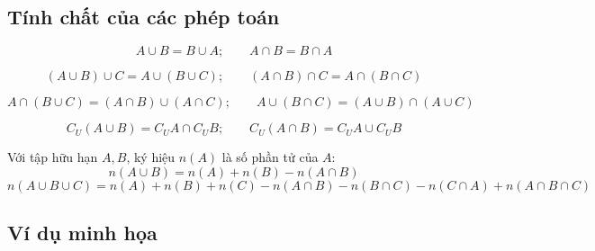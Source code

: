 \documentclass[12pt, a4paper]{report}
\begin{document}
\subsection{Tính chất của các phép toán}

\begin{dinhly}
  \[
    A \cup B = B \cup A; \qquad A \cap B = B \cap A
  \]
\end{dinhly}

\begin{dinhly}
  \[
    (A \cup B) \cup C = A \cup (B \cup C); \qquad (A \cap B) \cap C = A \cap (B \cap C)
  \]
\end{dinhly}

\begin{dinhly}
  \[
    A \cap (B \cup C) = (A \cap B) \cup (A \cap C); \qquad
    A \cup (B \cap C) = (A \cup B) \cap (A \cup C)
  \]
\end{dinhly}

\begin{dinhly}
  \[
    C_U(A \cup B) = C_U A \cap C_U B; \qquad
    C_U(A \cap B) = C_U A \cup C_U B
  \]
\end{dinhly}

\begin{dinhly}
  Với tập hữu hạn \(A, B\), ký hiệu \(n(A)\) là số phần tử của \(A\):
  \[
    n(A \cup B) = n(A) + n(B) - n(A \cap B)
  \]
  \[
    n(A \cup B \cup C) = n(A) + n(B) + n(C) - n(A \cap B) - n(B \cap C) - n(C \cap A) + n(A \cap B \cap C)
  \]
\end{dinhly}

\subsection{Ví dụ minh họa}
\end{document}
